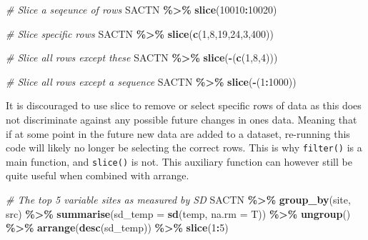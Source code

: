 \documentclass[
]{book}
\newenvironment{Shaded}{\begin{snugshade}}{\end{snugshade}}
\newcommand{\CommentTok}[1]{\textcolor[rgb]{0.56,0.35,0.01}{\textit{#1}}}
\newcommand{\DataTypeTok}[1]{\textcolor[rgb]{0.13,0.29,0.53}{#1}}
\newcommand{\DecValTok}[1]{\textcolor[rgb]{0.00,0.00,0.81}{#1}}
\newcommand{\KeywordTok}[1]{\textcolor[rgb]{0.13,0.29,0.53}{\textbf{#1}}}
\newcommand{\NormalTok}[1]{#1}
\newcommand{\OperatorTok}[1]{\textcolor[rgb]{0.81,0.36,0.00}{\textbf{#1}}}
\newcommand{\StringTok}[1]{\textcolor[rgb]{0.31,0.60,0.02}{#1}}
\begin{document}
\begin{Shaded}
\begin{Highlighting}[]
\CommentTok{\# Slice a seqeunce of rows}
\NormalTok{SACTN }\OperatorTok{\%>\%}\StringTok{ }
\StringTok{  }\KeywordTok{slice}\NormalTok{(}\DecValTok{10010}\OperatorTok{:}\DecValTok{10020}\NormalTok{)}

\CommentTok{\# Slice specific rows}
\NormalTok{SACTN }\OperatorTok{\%>\%}
\StringTok{  }\KeywordTok{slice}\NormalTok{(}\KeywordTok{c}\NormalTok{(}\DecValTok{1}\NormalTok{,}\DecValTok{8}\NormalTok{,}\DecValTok{19}\NormalTok{,}\DecValTok{24}\NormalTok{,}\DecValTok{3}\NormalTok{,}\DecValTok{400}\NormalTok{))}

\CommentTok{\# Slice all rows except these}
\NormalTok{SACTN }\OperatorTok{\%>\%}\StringTok{ }
\StringTok{  }\KeywordTok{slice}\NormalTok{(}\OperatorTok{{-}}\NormalTok{(}\KeywordTok{c}\NormalTok{(}\DecValTok{1}\NormalTok{,}\DecValTok{8}\NormalTok{,}\DecValTok{4}\NormalTok{)))}

\CommentTok{\# Slice all rows except a sequence}
\NormalTok{SACTN }\OperatorTok{\%>\%}\StringTok{ }
\StringTok{  }\KeywordTok{slice}\NormalTok{(}\OperatorTok{{-}}\NormalTok{(}\DecValTok{1}\OperatorTok{:}\DecValTok{1000}\NormalTok{))}
\end{Highlighting}
\end{Shaded}

It is discouraged to use slice to remove or select specific rows of data as this does not discriminate against any possible future changes in ones data. Meaning that if at some point in the future new data are added to a dataset, re-running this code will likely no longer be selecting the correct rows. This is why \texttt{filter()} is a main function, and \texttt{slice()} is not. This auxiliary function can however still be quite useful when combined with arrange.

\begin{Shaded}
\begin{Highlighting}[]
\CommentTok{\# The top 5 variable sites as measured by SD}
\NormalTok{SACTN }\OperatorTok{\%>\%}\StringTok{ }
\StringTok{  }\KeywordTok{group\_by}\NormalTok{(site, src) }\OperatorTok{\%>\%}\StringTok{ }
\StringTok{  }\KeywordTok{summarise}\NormalTok{(}\DataTypeTok{sd\_temp =} \KeywordTok{sd}\NormalTok{(temp, }\DataTypeTok{na.rm =}\NormalTok{ T)) }\OperatorTok{\%>\%}\StringTok{ }
\StringTok{  }\KeywordTok{ungroup}\NormalTok{() }\OperatorTok{\%>\%}\StringTok{ }
\StringTok{  }\KeywordTok{arrange}\NormalTok{(}\KeywordTok{desc}\NormalTok{(sd\_temp)) }\OperatorTok{\%>\%}\StringTok{ }
\StringTok{  }\KeywordTok{slice}\NormalTok{(}\DecValTok{1}\OperatorTok{:}\DecValTok{5}\NormalTok{)}
\end{Highlighting}
\end{Shaded}
\end{document}
